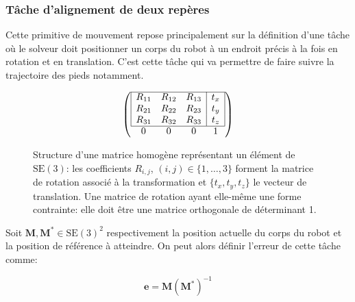 \subsubsection{Tâche d'alignement de deux repères}

Cette primitive de mouvement repose principalement sur la définition
d'une tâche où le solveur doit positionner un corps du robot à un
endroit précis à la fois en rotation et en translation. C'est cette
tâche qui va permettre de faire suivre la trajectoire des pieds
notamment.

\begin{figure}
  \begin{center}
    \begin{equation}
      \left (
      \begin{array}{cccc}
        \cline{1-4}
        \multicolumn{1}{|c}{R_{11}} & R_{12} & R_{13} & \multicolumn{1}{|c|}{t_x} \\
        \multicolumn{1}{|c}{R_{21}} & R_{22} & R_{23} & \multicolumn{1}{|c|}{t_y} \\
        \multicolumn{1}{|c}{R_{31}} & R_{32} & R_{33} & \multicolumn{1}{|c|}{t_z} \\
        \cline{1-4}
        0 & 0 & 0 & 1
      \end{array}
      \right )
    \end{equation}
  \end{center}
  \caption{Structure d'une matrice homogène représentant un élément de
    $\text{SE}(3)$: les coefficients $R_{i,j}$, $(i,j) \in \{1,
    \dotsc, 3\}$ forment la matrice de rotation associé à la
    transformation et $\{t_x, t_y, t_z\}$ le vecteur de
    translation. Une matrice de rotation ayant elle-même une forme
    contrainte: elle doit être une matrice orthogonale de déterminant
    1. \label{fig:matrixhomo}}
\end{figure}


Soit $\mathbf{M}, \mathbf{M}^{*} \in \text{SE}(3)^2$
respectivement la position actuelle du corps du robot et la position
de référence à atteindre. On peut alors définir l'erreur de cette
tâche comme:

\begin{equation}\label{eq:featurepoint6d}
  \mathbf{e} = \mathbf{M} (\mathbf{M}^{*})^{-1}
\end{equation}

